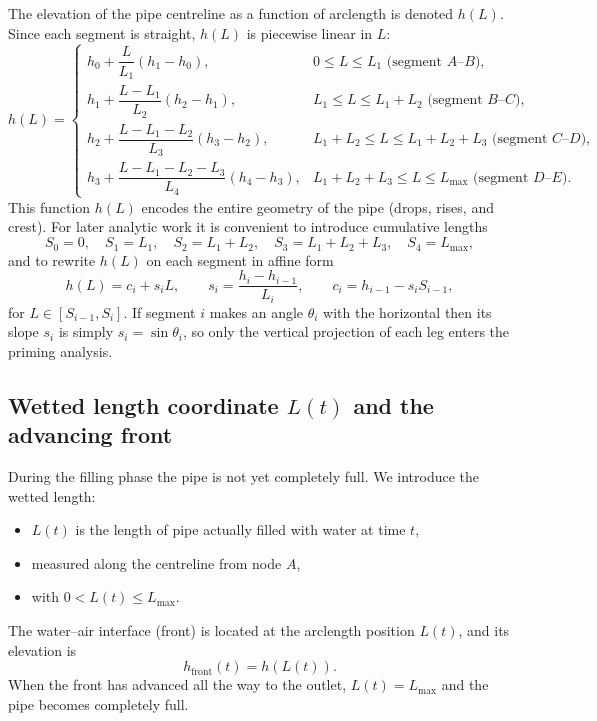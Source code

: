 \documentclass[11pt]{article}
\begin{document}
The elevation of the pipe centreline as a function of arclength is denoted $h(L)$. Since
each segment is straight, $h(L)$ is piecewise linear in $L$:
\[
h(L) = \begin{cases}
  h_0 + \dfrac{L}{L_1}(h_1 - h_0), & 0 \le L \le L_1 \text{ (segment $A$--$B$)}, \\[1em]
  h_1 + \dfrac{L - L_1}{L_2}(h_2 - h_1), & L_1 \le L \le L_1 + L_2 \text{ (segment $B$--$C$)}, \\[1em]
  h_2 + \dfrac{L - L_1 - L_2}{L_3}(h_3 - h_2), & L_1 + L_2 \le L \le L_1 + L_2 + L_3 \text{ (segment $C$--$D$)}, \\[1em]
  h_3 + \dfrac{L - L_1 - L_2 - L_3}{L_4}(h_4 - h_3), & L_1 + L_2 + L_3 \le L \le L_{\max} \text{ (segment $D$--$E$)}.
\end{cases}
\]
This function $h(L)$ encodes the entire geometry of the pipe (drops, rises, and crest).
For later analytic work it is convenient to introduce cumulative lengths
\[
  S_0 = 0,\quad S_1 = L_1,\quad S_2 = L_1 + L_2,\quad S_3 = L_1 + L_2 + L_3,\quad S_4 = L_{\max},
\]
and to rewrite $h(L)$ on each segment in affine form
\begin{equation}
  h(L) = c_i + s_i L,\qquad
  s_i = \frac{h_i - h_{i-1}}{L_i},\qquad
  c_i = h_{i-1} - s_i S_{i-1},
  \label{eq:linear-hi}
\end{equation}
for $L\in [S_{i-1},S_i]$. If segment $i$ makes an angle $\theta_i$ with the horizontal then
its slope $s_i$ is simply $s_i = \sin\theta_i$, so only the vertical projection of each leg
enters the priming analysis.

\subsection{Wetted length coordinate $L(t)$ and the advancing front}

During the filling phase the pipe is not yet completely full. We introduce the wetted length:
\begin{itemize}
  \item $L(t)$ is the length of pipe actually filled with water at time $t$,
  \item measured along the centreline from node $A$,
  \item with $0 < L(t) \le L_{\max}$.
\end{itemize}
The water--air interface (front) is located at the arclength position $L(t)$, and its elevation is
\[
  h_{\text{front}}(t) = h(L(t)).
\]
When the front has advanced all the way to the outlet, $L(t) = L_{\max}$ and the pipe becomes
completely full.
\end{document}
